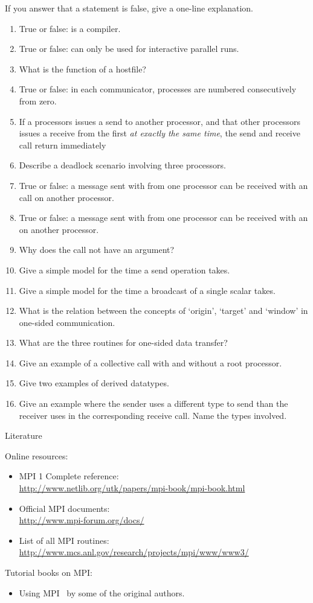 If you answer that a statement is false, give a one-line explanation.
\begin{enumerate}
\item True or false:  is a compiler.
\item True or false:  can only be used for interactive parallel runs.
\item What is the function of a hostfile?
\item True or false: in each communicator, processes are numbered consecutively from zero.
\item If a processors issues a send to another processor, and that other processors
  issues a receive from the first \emph{at exactly the same time}, the send and receive call
  return immediately
\item Describe a deadlock scenario involving three processors.
\item True or false: a message sent with  from one processor can be
  received with an  call on another processor.
\item True or false: a message sent with  from one processor can be
  received with an  on another processor.
\item Why does the  call not have an  argument?
\item Give a simple model for the time a send operation takes.
\item Give a simple model for the time a broadcast of a single scalar takes.
\item What is the relation between the concepts of `origin', `target'
  and `window' in one-sided communication.
\item What are the three routines for one-sided data transfer?
\item Give an example of a collective call with and without a root processor.
\item Give two examples of derived datatypes.
\item Give an example where the sender uses a different type to send
  than the receiver uses in the corresponding receive call. Name the types involved.

\end{enumerate}

 {Literature}

Online resources:
\begin{itemize}
\item MPI 1 Complete reference:\\ \url{http://www.netlib.org/utk/papers/mpi-book/mpi-book.html}
\item Official MPI documents:\\ \url{http://www.mpi-forum.org/docs/}
\item List of all MPI routines:\\ \url{http://www.mcs.anl.gov/research/projects/mpi/www/www3/}
\end{itemize}

Tutorial books on MPI:
\begin{itemize}
\item Using MPI~\cite{Gropp:UsingMPI1} by some of the original authors.
\end{itemize}

\endinput

Examples: 
compute pi
mandelbrot set
